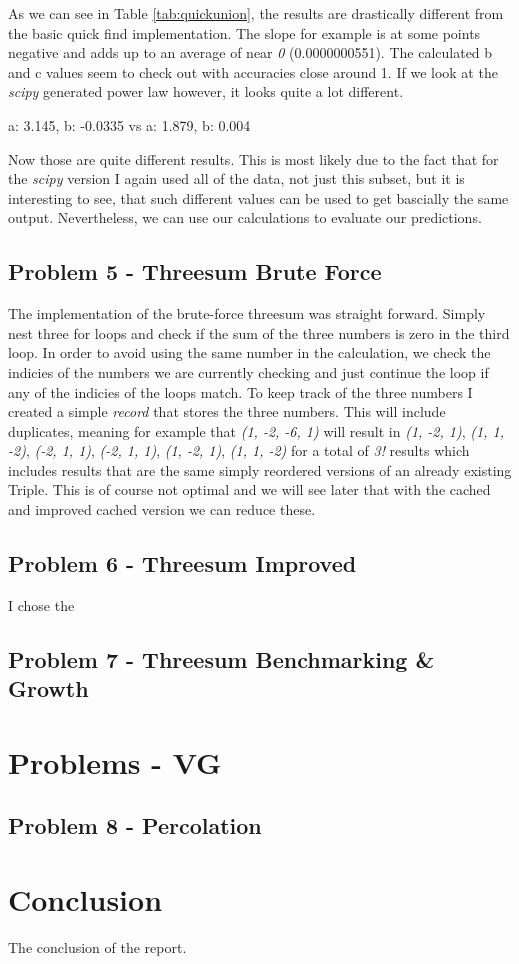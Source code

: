 \documentclass[12pt]{article}
\begin{document}
As we can see in Table \ref{tab:quickunion}, the results are drastically different from the basic quick find implementation.
The slope for example is at some points negative and adds up to an average of near \emph{0} (0.0000000551). The calculated b and c
values seem to check out with accuracies close around 1. If we look at the \emph{scipy} generated
power law however, it looks quite a lot different.

    a: 3.145, b: -0.0335 vs a: 1.879, b: 0.004

Now those are quite different results. This is most likely due to the fact that for the \emph{scipy} 
version I again used all of the data, not just this subset, but it is interesting to see, that
such different values can be used to get bascially the same output. Nevertheless, we can use our calculations to 
evaluate our predictions. 

\hypertarget{p5}{\subsection{Problem 5 - Threesum Brute Force}}

The implementation of the brute-force threesum was straight forward. Simply nest three for
loops and check if the sum of the three numbers is zero in the third loop. In order to avoid
using the same number in the calculation, we check the indicies of the numbers we are currently checking
 and just continue the loop if any of the indicies of the loops match. To keep track of the three numbers
I created a simple \emph{record} that stores the three numbers. This will include duplicates,
meaning for example that \emph{(1, -2, -6, 1)} will result in 
\emph{(1, -2, 1)}, \emph{(1, 1, -2)}, \emph{(-2, 1, 1)}, \emph{(-2, 1, 1)}, \emph{(1, -2, 1)}, \emph{(1, 1, -2)}
for a total of \emph{3!} results which includes results that are the same simply reordered versions
of an already existing Triple. This is of course not optimal and we will see later that with
the cached and improved cached version we can reduce these.

\hypertarget{p6}{\subsection{Problem 6 - Threesum Improved}}

I chose the 

\subsection{Problem 7 - Threesum Benchmarking \& Growth}

\section{Problems - VG}

\subsection{Problem 8 - Percolation}

\section{Conclusion}
The conclusion of the report.
\end{document}
